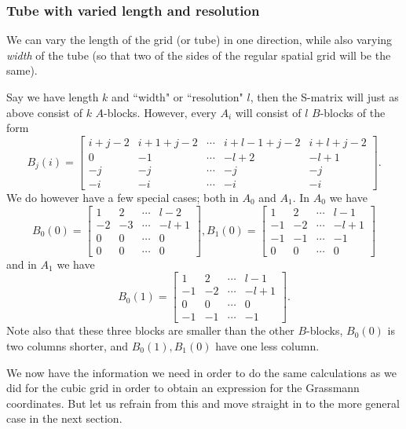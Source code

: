 \documentclass[a4paper,12pt]{book}
\theoremstyle{plain}
\theoremstyle{definition}
\begin{document}

\subsubsection{Tube with varied length and resolution} %
We can vary the length of the grid (or tube) in one direction, while also
varying \emph{width} of the tube (so that two of the sides of the 
regular spatial grid will be the same).

Say we have length \( k \) and ``width" or ``resolution" \( l \), then the
S-matrix will just as above consist of \( k \) \( A \)-blocks. However, every
\( A_i \) will consist of \( l \) \( B \)-blocks of the form
\[
	B_j(i) = \begin{bmatrix}
		i + j - 2 & i + 1 + j - 2 & \cdots & i + l - 1 + j - 2 & i + l + j - 2 \\
		0 & -1 & \cdots & -l + 2 & -l + 1 \\
		-j & -j & \cdots & -j & -j \\
		-i & -i & \cdots & -i & -i
	\end{bmatrix}.
\]
We do however have a few special cases; both in \( A_0 \) and \( A_1 \).
In \( A_0 \) we have
\[
	B_0(0) = \begin{bmatrix}
		1 & 2 & \cdots & l - 2 \\
		-2 & -3 & \cdots & -l + 1 \\
		0 & 0 & \cdots & 0 \\
		0 & 0 & \cdots & 0
	\end{bmatrix}, 
	B_1(0) = \begin{bmatrix}
		1 & 2 & \cdots & l - 1 \\
		-1 & -2 & \cdots & -l + 1 \\
		-1 & -1 & \cdots & -1 \\
		0 & 0 & \cdots & 0
	\end{bmatrix}
\]
and in \( A_1 \) we have
\[
	B_0(1) = \begin{bmatrix}
		1 & 2 & \cdots & l - 1 \\
		-1 & -2 & \cdots & -l + 1 \\
		0 & 0 & \cdots & 0 \\
		-1 & -1 & \cdots & -1
	\end{bmatrix}.
\]
Note also that these three blocks are smaller than the other \( B \)-blocks,
\( B_0(0) \) is two columns shorter, and \( B_0(1), B_1(0) \) have one less
column.

We now have the information we need in order to do the same calculations as we
did for the cubic grid in order to obtain an expression for the Grassmann
coordinates. But let us refrain from this and move straight in to the more
general case in the next section.
\end{document}
